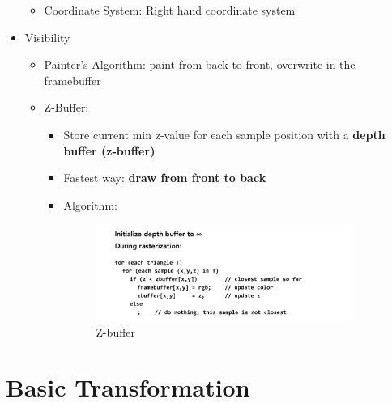\documentclass{article}
\begin{document}
\begin{itemize}
\begin{itemize}
\item Coordinate System: Right hand coordinate system
\end{itemize}
\item 
Visibility
\begin{itemize}
    \item Painter's Algorithm: paint from back to front, overwrite in the framebuffer
    \item Z-Buffer: 
    \begin{itemize}
        \item Store current min z-value for each sample position with a \textbf{depth buffer (z-buffer)}
        \item Fastest way: \textbf{draw from front to back}
\item Algorithm:
\begin{figure}[H]
    \centering
    \includegraphics[width=0.9\textwidth]{imgs/z-buffer.jpg}
    \caption{Z-buffer}

\end{figure}
        
    \end{itemize}
    
\end{itemize}
\end{itemize}
\section{Basic Transformation}
\end{document}
